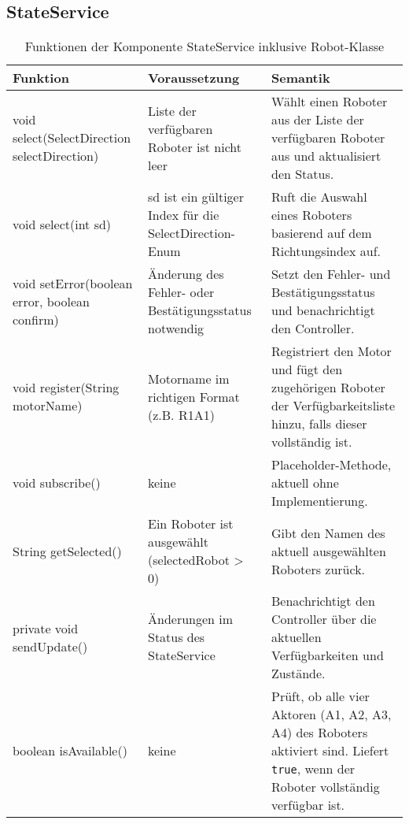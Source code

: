     \subsection{StateService}
    \begin{table}[h!]
        \centering
        \begin{tabular}{|p{5cm}|p{5cm}|p{5cm}|}
            \hline
            \textbf{Funktion} & \textbf{Voraussetzung} & \textbf{Semantik} \\
            \hline
            void select(SelectDirection selectDirection) & Liste der verfügbaren Roboter ist nicht leer & Wählt einen Roboter aus der Liste der verfügbaren Roboter aus und aktualisiert den Status. \\
            \hline
            void select(int sd) & sd ist ein gültiger Index für die SelectDirection-Enum & Ruft die Auswahl eines Roboters basierend auf dem Richtungsindex auf. \\
            \hline
            void setError(boolean error, boolean confirm) & Änderung des Fehler- oder Bestätigungsstatus notwendig & Setzt den Fehler- und Bestätigungsstatus und benachrichtigt den Controller. \\
            \hline
            void register(String motorName) & Motorname im richtigen Format (z.B. R1A1) & Registriert den Motor und fügt den zugehörigen Roboter der Verfügbarkeitsliste hinzu, falls dieser vollständig ist. \\
            \hline
            void subscribe() & keine & Placeholder-Methode, aktuell ohne Implementierung. \\
            \hline
            String getSelected() & Ein Roboter ist ausgewählt (selectedRobot > 0) & Gibt den Namen des aktuell ausgewählten Roboters zurück. \\
            \hline
            private void sendUpdate() & Änderungen im Status des StateService & Benachrichtigt den Controller über die aktuellen Verfügbarkeiten und Zustände. \\
            \hline
            boolean isAvailable() & keine & Prüft, ob alle vier Aktoren (A1, A2, A3, A4) des Roboters aktiviert sind. Liefert \texttt{true}, wenn der Roboter vollständig verfügbar ist. \\
            \hline
        \end{tabular}
        \caption{Funktionen der Komponente StateService inklusive Robot-Klasse}
        \label{tab:StateService}
    \end{table}


